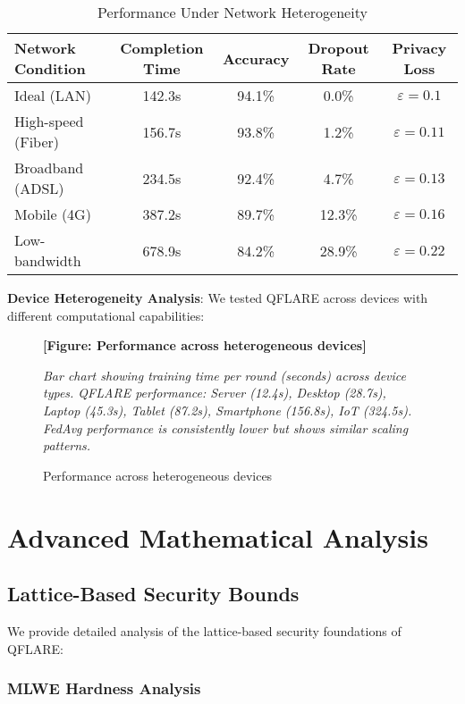 \documentclass[onecolumn,11pt]{article}
\begin{document}
\begin{table}[htbp]
\centering
\caption{Performance Under Network Heterogeneity}
\begin{tabular}{|l|c|c|c|c|}
\hline
\textbf{Network Condition} & \textbf{Completion Time} & \textbf{Accuracy} & \textbf{Dropout Rate} & \textbf{Privacy Loss} \\
\hline
Ideal (LAN) & 142.3s & 94.1\% & 0.0\% & $\varepsilon = 0.1$ \\
High-speed (Fiber) & 156.7s & 93.8\% & 1.2\% & $\varepsilon = 0.11$ \\
Broadband (ADSL) & 234.5s & 92.4\% & 4.7\% & $\varepsilon = 0.13$ \\
Mobile (4G) & 387.2s & 89.7\% & 12.3\% & $\varepsilon = 0.16$ \\
Low-bandwidth & 678.9s & 84.2\% & 28.9\% & $\varepsilon = 0.22$ \\
\hline
\end{tabular}
\end{table}

\textbf{Device Heterogeneity Analysis}:
We tested QFLARE across devices with different computational capabilities:

\begin{figure}[htbp]
\centering
\textbf{[Figure: Performance across heterogeneous devices]}

\textit{Bar chart showing training time per round (seconds) across device types. QFLARE performance: Server (12.4s), Desktop (28.7s), Laptop (45.3s), Tablet (87.2s), Smartphone (156.8s), IoT (324.5s). FedAvg performance is consistently lower but shows similar scaling patterns.}
\caption{Performance across heterogeneous devices}
\end{figure}

\section{Advanced Mathematical Analysis}

\subsection{Lattice-Based Security Bounds}

We provide detailed analysis of the lattice-based security foundations of QFLARE:

\subsubsection{MLWE Hardness Analysis}
\end{document}
